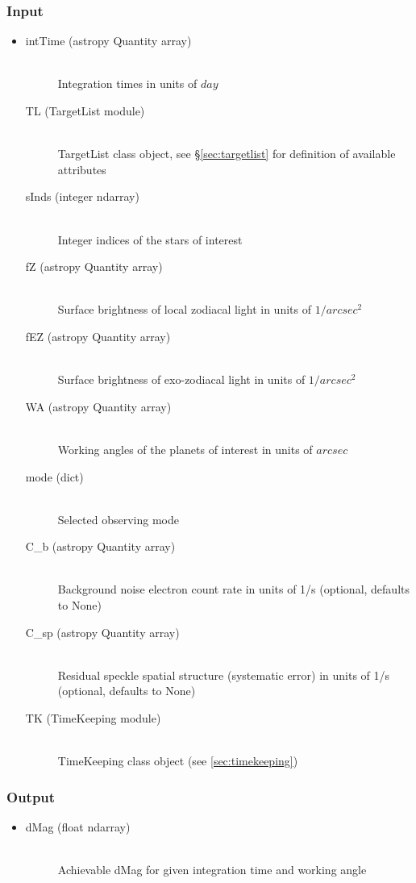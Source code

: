 \documentclass[cleanfoot]{asme2ej}
\begin{document}
\subsubsection*{Input}
\begin{itemize}
\item 
\begin{description}
    \item[intTime (astropy Quantity array)] \hfill \\ Integration times in units of $ day $
    \item[TL (TargetList module)] \hfill \\ TargetList class object, see \S\ref{sec:targetlist} for definition of available attributes
    \item[sInds (integer ndarray)] \hfill \\ Integer indices of the stars of interest
    \item[fZ (astropy Quantity array)] \hfill \\ Surface brightness of local zodiacal light in units of $ 1/arcsec^2 $
    \item[fEZ (astropy Quantity array)] \hfill \\ Surface brightness of exo-zodiacal light in units of $ 1/arcsec^2 $
    \item[WA (astropy Quantity array)] \hfill \\ Working angles of the planets of interest in units of $ arcsec $
    \item[mode (dict)] \hfill \\ Selected observing mode
    \item[C\_b (astropy Quantity array)] \hfill \\ Background noise electron count rate in units of 1/s (optional, defaults to None)
    \item[C\_sp (astropy Quantity array)] \hfill \\ Residual speckle spatial structure (systematic error) in units of 1/s (optional, defaults to None)
    \item[TK (TimeKeeping module)] \hfill \\ TimeKeeping class object (see \ref{sec:timekeeping})
\end{description}
\end{itemize}
\subsubsection*{Output}
\begin{itemize}
\item 
\begin{description}
    \item[dMag (float ndarray)] \hfill \\ Achievable dMag for given integration time and working angle
\end{description}
\end{itemize}
\end{document}
